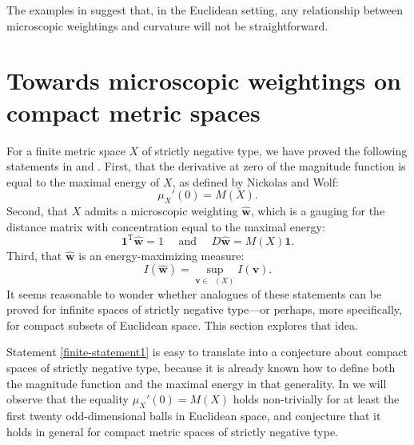 \documentclass[a4paper, oneside, reqno]{amsart}
\theoremstyle{definition}
\theoremstyle{remark}
\numberwithin{equation}{section}
\renewcommand{\vec}{\mathbf}
\newcommand{\onevector}{\mathbf{1}}
\newcommand{\transpose}{\mathrm{T}}
\newcommand{\micro}{\widehat{\vec{w}}}
\DeclareMathOperator{\measmassone}{\mathcal{M}_1}
\begin{document}
The examples in  suggest that, in the Euclidean setting, any relationship between microscopic weightings and curvature will not be straightforward.


\section{Towards microscopic weightings on compact metric spaces}
\label{sec:infinite-spaces}

For a finite metric space \(X\) of strictly negative type, we have proved the following statements in  and . First, that the derivative at zero of the magnitude function is equal to the maximal energy of \(X\), as defined by Nickolas and Wolf:
\begin{equation}
\label{finite-statement1}
    \mu_X'(0)= M(X).
\end{equation}
Second, that \(X\) admits a microscopic weighting \(\micro\), which is a gauging for the distance matrix with concentration equal to the maximal energy:
\begin{equation}
\label{finite-statement2}
    \onevector^\transpose \micro = 1 \quad \text{ and } \quad D \micro = M(X) \onevector.
\end{equation}
Third, that \(\micro\) is an energy-maximizing measure:
\begin{equation}
\label{finite-statement3}
    I(\micro) = \sup_{\vec{v} \in \measmassone(X)} I(\vec{v}).
\end{equation}
It seems reasonable to wonder whether analogues of these statements can be proved for infinite spaces of strictly negative type---or perhaps, more specifically, for compact subsets of Euclidean space. This section explores that idea.

Statement \eqref{finite-statement1} is easy to translate into a conjecture about compact spaces of strictly negative type, because it is already known how to define both the magnitude function and the maximal energy in that generality. In  we will observe that the equality \(\mu_X'(0)= M(X)\) holds non-trivially for at least the first twenty odd-dimensional balls in Euclidean space, and conjecture that it holds in general for compact metric spaces of strictly negative type.
\end{document}
